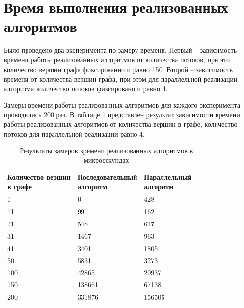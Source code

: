 \section{Время выполнения реализованных алгоритмов}

Было проведено два эксперимента по замеру времени. Первый -- зависимость времени работы реализованных алгоритмов от количества потоков, при это количество вершин графа фиксированно и равно 150. Второй -- зависимость времени  от количества вершин графа, при этом для параллельной реализации алгоритма количество потоков фиксировано и равно 4.

Замеры времени работы реализованных алгоритмов для каждого эксперимента проводились 200 раз. 
В таблице \ref{tab:time} представлен результат зависимости времени работы реализованных алгоритмов от количества вершин в графе, количество потоков для параллельной реализации равно 4.
\clearpage
\begin{table}[H]
	\begin{center}
		\begin{flushleft}
			\caption{\label{tab:time}Результаты замеров времени реализованных алгоритмов в микросекундах}
		\end{flushleft}
		\begin{tabular}{|l|l|l|l|l|}
			\hline \specialcell{Количество вершин\\в графе} & \specialcell{Последовательный\\алгоритм} &
			\specialcell{Параллельный\\алгоритм}  \\\hline
			1   & 0      & 428   \\ \hline
			11  & 99     & 162   \\ \hline
			21  & 548    & 617   \\ \hline
			31  & 1467   & 963   \\ \hline
			41  & 3401   & 1805   \\ \hline
			50  & 5831   & 3273   \\ \hline
			100 & 42865  & 20937   \\ \hline
			150 & 138661 & 67138   \\ \hline
			200 & 331876 & 156506     \\ \hline
		\end{tabular}
	\end{center}
\end{table}


